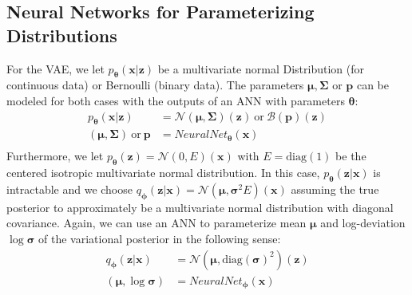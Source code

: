 \documentclass[12pt]{report}
\theoremstyle{definition}
\begin{document}
\subsection{Neural Networks for Parameterizing Distributions}
For the VAE, we let $p_{\pmb{\theta}}(\mathbf{x}|\mathbf{z})$ be a multivariate normal Distribution (for continuous data) or Bernoulli (binary data). The parameters $\pmb{\mu}, \pmb{\Sigma}$ or $\mathbf{p}$ can be modeled for both cases with the outputs of an ANN with parameters $\pmb{\theta}$:
\begin{equation}
\begin{split}
p_{\pmb{\theta}}(\mathbf{x}|\mathbf{z}) & = \mathcal{N}(\pmb{\mu}, \pmb{\Sigma})(\mathbf{z}) \ \mathrm{or} \ \mathcal{B}(\mathbf{p})(\mathbf{z}) \\
(\pmb{\mu}, \pmb{\Sigma}) \ \mathrm{or} \ \mathbf{p} & = NeuralNet_{\pmb{\theta}}(\mathbf{x}) \\
\end{split}
\end{equation}
Furthermore, we let $p_{\pmb{\theta}}(\mathbf{z})=\mathcal{N}(0, E)(\mathbf{x})$ with $E=\mathrm{diag}(1)$ be the centered isotropic multivariate normal distribution. In this case,  $p_{\pmb{\theta}}(\mathbf{z}|\mathbf{x})$ is intractable and we choose $q_{\pmb{\phi}}(\mathbf{z}|\mathbf{x})=\mathcal{N}(\pmb{\mu}, \pmb{\sigma}^2 E)(\mathbf{x})$ assuming the true posterior to approximately be a multivariate normal distribution with diagonal covariance. Again, we can use an ANN to parameterize mean $\pmb{\mu}$ and log-deviation $\log \pmb{\sigma}$ of the variational posterior in the following sense:
\begin{equation}
\begin{split}
q_{\pmb{\phi}}(\mathbf{z}|\mathbf{x}) & = \mathcal{N}(\pmb{\mu}, \mathrm{diag}(\pmb{\sigma})^2)(\mathbf{z}) \\
(\pmb{\mu}, \log \pmb{\sigma}) & = NeuralNet_{\pmb{\phi}}(\mathbf{x}) \\
\end{split}
\end{equation}
\end{document}

